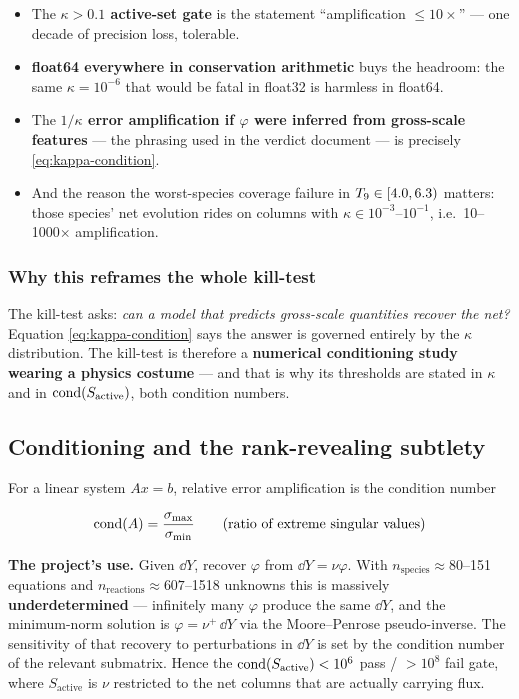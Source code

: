\begin{itemize}
\item The \textbf{$\kappa > 0.1$ active-set gate} is the statement
      ``amplification $\leq 10\times$'' --- one decade of precision loss,
      tolerable.
\item \textbf{float64 everywhere in conservation arithmetic} buys the headroom:
      the same $\kappa = 10^{-6}$ that would be fatal in float32 is harmless in
      float64.
\item The \textbf{$1/\kappa$ error amplification if $\varphi$ were inferred from
      gross-scale features} --- the phrasing used in the verdict document --- is
      precisely \eqref{eq:kappa-condition}.
\item And the reason the worst-species coverage failure in
      $T_{9} \in [4.0, 6.3)$ matters: those species' net evolution rides on
      columns with $\kappa \in 10^{-3}$--$10^{-1}$, i.e.\ 10--1000$\times$
      amplification.
\end{itemize}

\subsubsection{Why this reframes the whole kill-test}
\label{sec:killtestreframe}

The kill-test asks: \emph{can a model that predicts gross-scale quantities
recover the net?} Equation \eqref{eq:kappa-condition} says the answer is
governed entirely by the $\kappa$ distribution. The kill-test is therefore a
\textbf{numerical conditioning study wearing a physics costume} --- and that is
why its thresholds are stated in $\kappa$ and in $\operatorname{cond}(S_{\mathrm{active}})$,
both condition numbers.

\subsection{Conditioning and the rank-revealing subtlety}
\label{sec:conditioning}

For a linear system $A x = b$, relative error amplification is the condition
number

\begin{equation*}
\operatorname{cond}(A) = \frac{\sigma_{\max}}{\sigma_{\min}} \qquad
(\text{ratio of extreme singular values})
\end{equation*}

\textbf{The project's use.} Given $\dd Y$, recover $\varphi$ from
$\dd Y = \nu\varphi$. With $n_{\text{species}} \approx 80$--151 equations and
$n_{\text{reactions}} \approx 607$--1518 unknowns this is massively
\textbf{underdetermined} --- infinitely many $\varphi$ produce the same $\dd Y$,
and the minimum-norm solution is $\varphi = \nu^{+}\,\dd Y$ via the
Moore--Penrose pseudo-inverse. The sensitivity of that recovery to perturbations
in $\dd Y$ is set by the condition number of the relevant submatrix. Hence the
$\operatorname{cond}(S_{\mathrm{active}}) < 10^{6}$ pass / $> 10^{8}$ fail gate, where
$S_{\mathrm{active}}$ is $\nu$ restricted to the net columns that are actually
carrying flux.

